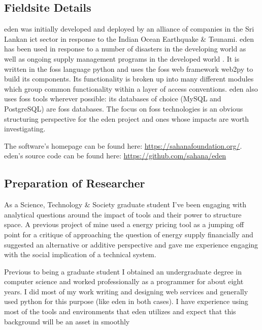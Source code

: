 \documentclass[a4paper,man,natbib]{apa6}
\begin{document}
   \subsection*{Fieldsite Details}
   \acrshort{eden} was initially developed and deployed by an alliance of companies in the Sri Lankan \acrfull{ict} sector in response to the Indian Ocean Earthquake \& Tsunami. \acrshort{eden} has been used in response to a number of disasters in the developing world as well as ongoing supply management programs in the developed world \citep{Sahana_Foundation_undated-hl}. It is written in the \acrshort{foss} language \Gls{python} and uses the \acrshort{foss} \gls{web framework} web2py to build its components. Its functionality is broken up into many different modules which group common functionality within a layer of access conventions. \acrshort{eden} also uses \acrshort{foss} tools wherever possible: its databases of choice (\Gls{MySQL} and \Gls{PostgreSQL}) are \acrshort{foss} databases. The focus on \acrlong{foss} technologies is an obvious structuring perspective for the \acrshort{eden} project and ones whose impacts are worth investigating.

   The software's homepage can be found here: \url{https://sahanafoundation.org/}. \linebreak 
   \acrshort{eden}'s source code can be found here: \url{https://github.com/sahana/eden} \linebreak 

   \subsection*{Preparation of Researcher}
   As a Science, Technology \& Society graduate student I've been engaging with analytical questions around the impact of tools and their power to structure space. A previous project of mine used a energy pricing tool as a jumping off point for a critique of approaching the question of energy supply financially and suggested an alternative or additive perspective and gave me experience engaging with the social implication of a technical system.

   Previous to being a graduate student I obtained an undergraduate degree in computer science and worked professionally as a programmer for about eight years. I did most of my work writing and designing web services and generally used python for this purpose (like \acrshort{eden} in both cases). I have experience using most of the tools and environments that \acrshort{eden} utilizes and expect that this background will be an asset in smoothly 
\end{document}
